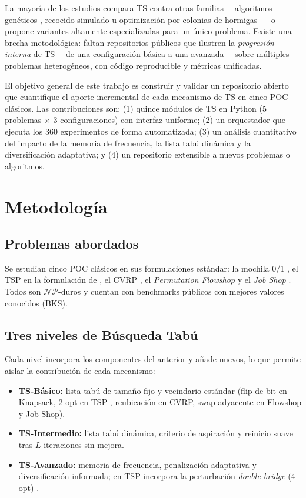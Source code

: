 \documentclass[12pt]{article}
\newcommand{\NP}{\ensuremath{\mathcal{NP}}}
\begin{document}
La mayoría de los estudios compara TS contra otras familias
---algoritmos genéticos \citep{holland1975adaptation}, recocido simulado
\citep{kirkpatrick1983optimization} u optimización por colonias de hormigas
\citep{dorigo1996ant}--- o propone variantes altamente especializadas para
un único problema. Existe una brecha metodológica: faltan repositorios
públicos que ilustren la \emph{progresión interna} de TS ---de una
configuración básica a una avanzada--- sobre múltiples problemas
heterogéneos, con código reproducible y métricas unificadas.

El objetivo general de este trabajo es construir y validar un repositorio
abierto que cuantifique el aporte incremental de cada mecanismo de TS en
cinco POC clásicos. Las contribuciones son: (1) quince módulos de TS en
Python (5 problemas $\times$ 3 configuraciones) con interfaz uniforme;
(2) un orquestador que ejecuta los 360 experimentos de forma automatizada;
(3) un análisis cuantitativo del impacto de la memoria de frecuencia, la
lista tabú dinámica y la diversificación adaptativa; y (4) un repositorio
extensible a nuevos problemas o algoritmos.

\section{Metodología}

\subsection{Problemas abordados}

Se estudian cinco POC clásicos en sus formulaciones estándar: la mochila
0/1 \citep{martello1990knapsack}, el TSP en la formulación de
\citet{dantzig1954solution}, el CVRP \citep{laporte1992vehicle}, el
\textit{Permutation Flowshop} \citep{pinedo2016scheduling} y el
\textit{Job Shop} \citep{garey1976complexity}. Todos son \NP-duros y
cuentan con benchmarks públicos con mejores valores conocidos (BKS).

\subsection{Tres niveles de Búsqueda Tabú}

Cada nivel incorpora los componentes del anterior y añade nuevos, lo que
permite aislar la contribución de cada mecanismo:

\begin{itemize}
  \item \textbf{TS-Básico:} lista tabú de tamaño fijo y vecindario
    estándar (flip de bit en Knapsack, 2-opt en TSP
    \citep{lin1973effective}, reubicación en CVRP, swap adyacente en
    Flowshop y Job Shop).
  \item \textbf{TS-Intermedio:} lista tabú dinámica, criterio de
    aspiración y reinicio suave tras $L$ iteraciones sin mejora.
  \item \textbf{TS-Avanzado:} memoria de frecuencia, penalización
    adaptativa y diversificación informada; en TSP incorpora la
    perturbación \textit{double-bridge} (4-opt)
    \citep{johnson1997traveling}.
\end{itemize}
\end{document}
